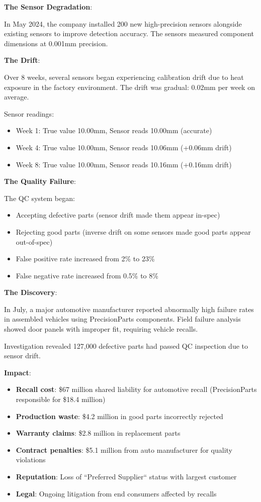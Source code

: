 \textbf{The Sensor Degradation}:

In May 2024, the company installed 200 new high-precision sensors alongside existing sensors to improve detection accuracy. The sensors measured component dimensions at 0.001mm precision.

\textbf{The Drift}:

Over 8 weeks, several sensors began experiencing calibration drift due to heat exposure in the factory environment. The drift was gradual: 0.02mm per week on average.

Sensor readings:
\begin{itemize}
    \item Week 1: True value 10.00mm, Sensor reads 10.00mm (accurate)
    \item Week 4: True value 10.00mm, Sensor reads 10.06mm (+0.06mm drift)
    \item Week 8: True value 10.00mm, Sensor reads 10.16mm (+0.16mm drift)
\end{itemize}

\textbf{The Quality Failure}:

The QC system began:
\begin{itemize}
    \item Accepting defective parts (sensor drift made them appear in-spec)
    \item Rejecting good parts (inverse drift on some sensors made good parts appear out-of-spec)
    \item False positive rate increased from 2\% to 23\%
    \item False negative rate increased from 0.5\% to 8\%
\end{itemize}

\textbf{The Discovery}:

In July, a major automotive manufacturer reported abnormally high failure rates in assembled vehicles using PrecisionParts components. Field failure analysis showed door panels with improper fit, requiring vehicle recalls.

Investigation revealed 127,000 defective parts had passed QC inspection due to sensor drift.

\textbf{Impact}:
\begin{itemize}
    \item \textbf{Recall cost}: \$67 million shared liability for automotive recall (PrecisionParts responsible for \$18.4 million)
    \item \textbf{Production waste}: \$4.2 million in good parts incorrectly rejected
    \item \textbf{Warranty claims}: \$2.8 million in replacement parts
    \item \textbf{Contract penalties}: \$5.1 million from auto manufacturer for quality violations
    \item \textbf{Reputation}: Loss of ``Preferred Supplier`` status with largest customer
    \item \textbf{Legal}: Ongoing litigation from end consumers affected by recalls
\end{itemize}

